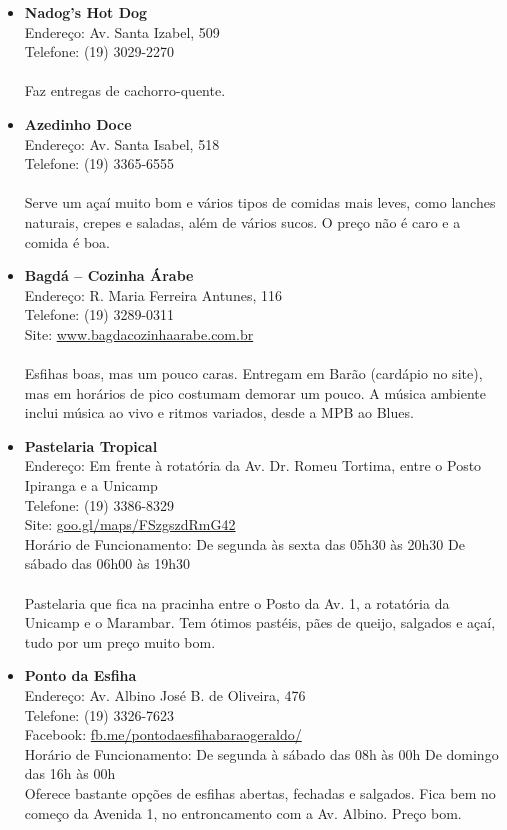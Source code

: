 \begin{itemize}
\item \textbf{Nadog's Hot Dog}
  \\Endereço: Av. Santa Izabel, 509
  \\Telefone: (19) 3029-2270
  \\
  \\Faz entregas de cachorro-quente.

\item \textbf{Azedinho Doce}
  \\Endereço: Av. Santa Isabel, 518
  \\Telefone: (19) 3365-6555
  \\
  \\Serve um açaí muito bom e vários tipos de comidas mais leves, como lanches
  naturais, crepes e saladas, além de vários sucos. O preço não é caro e a
  comida é boa.

\item \textbf{Bagdá -- Cozinha Árabe}
  \\Endereço: R. Maria Ferreira Antunes, 116
  \\Telefone: (19) 3289-0311
  \\Site: \url{www.bagdacozinhaarabe.com.br}
  \\
  \\Esfihas boas, mas um pouco caras. Entregam em Barão (cardápio no site), mas
  em horários de pico costumam demorar um pouco. A música ambiente inclui
  música ao vivo e ritmos variados, desde a MPB ao Blues.

\item \textbf{Pastelaria Tropical}
  \\Endereço: Em frente à rotatória da Av. Dr. Romeu Tortima,
  entre o Posto Ipiranga e a Unicamp
  \\Telefone: (19) 3386-8329
  \\Site: \url{goo.gl/maps/FSzgszdRmG42}
  \\Horário de Funcionamento: De segunda às sexta das 05h30 às 20h30
  De sábado das 06h00 às 19h30
  \\
  \\ Pastelaria que fica na pracinha entre o Posto da Av. 1, a rotatória da
  Unicamp e o Marambar. Tem ótimos pastéis, pães de queijo, salgados e açaí,
  tudo por um preço muito bom.

\item \textbf{Ponto da Esfiha}
  \\Endereço: Av. Albino José B. de Oliveira, 476
  \\Telefone: (19) 3326-7623
  \\Facebook: \url{fb.me/pontodaesfihabaraogeraldo/}
  \\Horário de Funcionamento: De segunda à sábado das 08h às 00h
  De domingo das 16h às 00h
  \\Oferece bastante opções de esfihas abertas, fechadas e salgados. Fica bem no
  começo da Avenida 1, no entroncamento com a Av. Albino. Preço bom.


\end{itemize}

